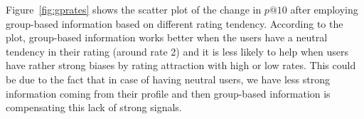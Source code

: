 

Figure~\ref{fig:gprates} shows the scatter plot of the change in $p@10$ after employing group-based information based on different rating tendency.
According to the plot, group-based information works better when the users have a neutral tendency in their rating (around rate 2) and it is less likely to help when users have rather strong biases by rating attraction with high or low rates. This could be due to the fact that in case of having neutral users, we have less strong information coming from their profile and then group-based information is compensating this lack of strong signals.